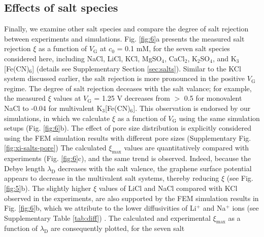 \documentclass[journal=langd5,email=true, hyperref=true, keywords=false]{achemso}
\begin{document}
\subsection*{Effects of salt species}
\label{sec:salts}

Finally, we examine other salt species and compare the degree of salt
rejection between experiments and simulations. Fig. \ref{fig:6}a
presents the measured salt rejection $\xi$ as a function of
$V_{\mathrm{G}}$ at $c_{0}$ = 0.1 mM, for the seven salt species
considered here, including NaCl, LiCl, KCl, MgSO$_{4}$, CaCl$_{2}$,
K$_{2}$SO$_{4}$, and K$_{3}$[Fe(CN)$_{6}$] (details see Supplementary
Section \ref{sec:salts}). Similar to the KCl system discussed
earlier, the salt rejection is more pronounced in the positive
$V_{\mathrm{G}}$ regime. 
The degree of salt rejection deceases with
the salt valance; for example, the measured $\xi$ values at
$V_{\mathrm{G}}$ = 1.25 V decreases from $>$ 0.5 for monovalent NaCl
to -0.04 for multivalent K$_{3}$[Fe(CN)$_{6}$]. This observation is
endorsed by our simulations, in which we calculate $\xi$ as a function
of $V_{\mathrm{G}}$ using the same simulation setups (Fig.
\ref{fig:6}b). 
{
The effect of pore size distribution is explicitly
considered using the FEM simulation results with different pore sizes
(Supplementary Fig. \ref{fig:xi-salts-pore})} 
The calculated $\xi_{\mathrm{max}}$ values are
quantitatively compared with experiments (Fig. \ref{fig:6}c), and
the same trend is observed. Indeed, because the Debye length
$\lambda_{\mathrm{D}}$ decreases with the salt valence, the graphene
surface potential appears to decrease in the multivalent salt systems,
thereby reducing $\xi$ (see Fig. \ref{fig:5}b).
{
The slightly higher $\xi$ values of LiCl and NaCl compared with KCl observed in the experiments, 
are also supported by the FEM simulation results in Fig. \ref{fig:6}b, 
which we attribute to the lower diffusivities of Li$^{+}$ and Na$^{+}$ ions (see Supplementary Table \ref{tab:diff})
}.
The calculated and
experimental $\xi_{\mathrm{max}}$ as a function of
$\lambda_{\mathrm{D}}$ are consequently plotted, for the seven salt
\end{document}
